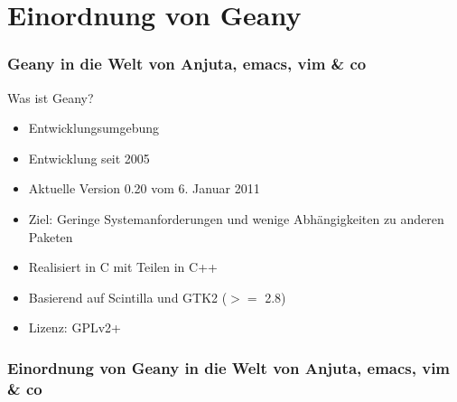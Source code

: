 \section[Einordnung]{Einordnung von Geany}
\begin{frame}
	\frametitle{Geany in die Welt von Anjuta, emacs, vim \& co}
	\begin{block}{Was ist Geany?}
		\begin{itemize}
			\item Entwicklungsumgebung
			\item Entwicklung seit 2005
			\item Aktuelle Version 0.20 vom 6. Januar 2011
			\item Ziel: Geringe Systemanforderungen und wenige
				  Abhängigkeiten zu anderen Paketen
			\item Realisiert in C mit Teilen in C++
			\item Basierend auf Scintilla und GTK2 ($>=$ 2.8)
			\item Lizenz: GPLv2+
		\end{itemize}
	\end{block}
\end{frame}

\begin{frame}
	\frametitle{Einordnung von Geany in die Welt von Anjuta, emacs, vim \& co}
	\begin{figure}[ht]
		\centering
 		\footnotesize
		
	\end{figure}
\end{frame}
